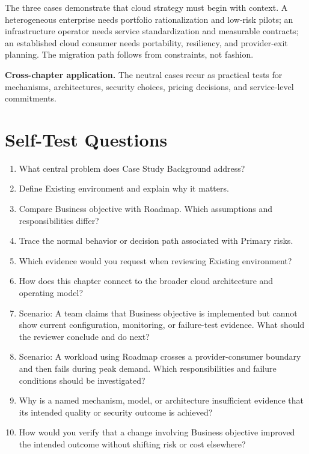 \documentclass[11pt]{article}
\begin{document}
\begin{synthesisbox}
The three cases demonstrate that cloud strategy must begin with context. A heterogeneous enterprise needs portfolio rationalization and low-risk pilots; an infrastructure operator needs service standardization and measurable contracts; an established cloud consumer needs portability, resiliency, and provider-exit planning. The migration path follows from constraints, not fashion.
\par\smallskip
\textbf{Cross-chapter application.} The neutral cases recur as practical tests for mechanisms, architectures, security choices, pricing decisions, and service-level commitments.
\end{synthesisbox}
\section{Self-Test Questions}
\begin{enumerate}
\item What central problem does Case Study Background address?
\item Define Existing environment and explain why it matters.
\item Compare Business objective with Roadmap. Which assumptions and responsibilities differ?
\item Trace the normal behavior or decision path associated with Primary risks.
\item Which evidence would you request when reviewing Existing environment?
\item How does this chapter connect to the broader cloud architecture and operating model?
\item Scenario: A team claims that Business objective is implemented but cannot show current configuration, monitoring, or failure-test evidence. What should the reviewer conclude and do next?
\item Scenario: A workload using Roadmap crosses a provider-consumer boundary and then fails during peak demand. Which responsibilities and failure conditions should be investigated?
\item Why is a named mechanism, model, or architecture insufficient evidence that its intended quality or security outcome is achieved?
\item How would you verify that a change involving Business objective improved the intended outcome without shifting risk or cost elsewhere?
\end{enumerate}
\clearpage
\end{document}
